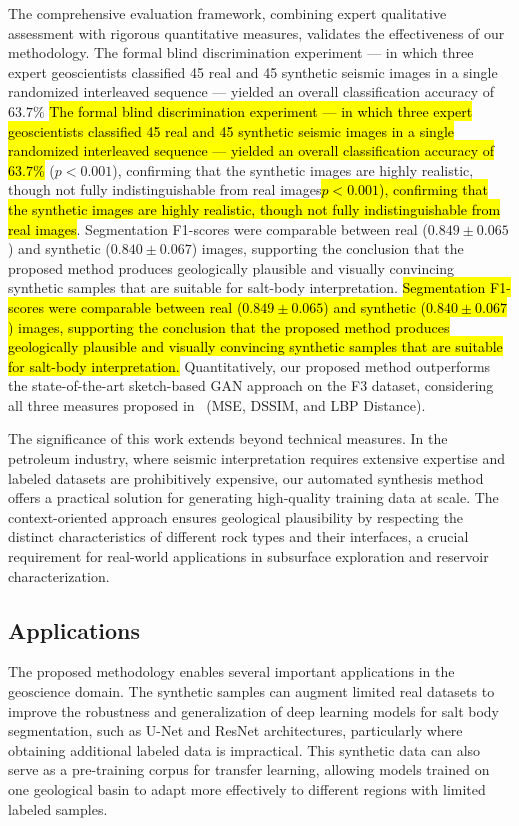 \documentclass{ieeeaccess}
\makeatletter
\DeclareRobustCommand{\DIFaddbegin}{\DIFOaddbegin \let\includegraphics\DIFaddincludegraphics} %
\DeclareRobustCommand{\DIFaddend}{\DIFOaddend \let\includegraphics\DIFOincludegraphics} %
\DeclareRobustCommand{\DIFdelbegin}{\DIFOdelbegin \let\includegraphics\DIFdelincludegraphics} %
\DeclareRobustCommand{\DIFdelend}{\DIFOaddend \let\includegraphics\DIFOincludegraphics} %
\let\sout@orig\sout %
\renewcommand{\sout}[1]{\ifmmode\text{\sout@orig{\ensuremath{#1}}}\else\sout@orig{#1}\fi} %
\providecommand{\DIFadd}[1]{{\protect\color{blue}#1}}
\providecommand{\DIFdel}[1]{{\protect\color{red}\sout{#1}}}
\renewcommand{\DIFadd}[1]{\ifmmode#1\else\begingroup\let\protect\relax\hl{#1}\endgroup\fi}
\renewcommand{\DIFdel}[1]{}
\providecommand{\DIFaddbegin}{}
\providecommand{\DIFaddend}{}
\providecommand{\DIFdelbegin}{}
\providecommand{\DIFdelend}{}
\renewcommand{\DIFaddbegin}{}
\renewcommand{\DIFaddend}{}
\renewcommand{\DIFdelbegin}{}
\renewcommand{\DIFdelend}{}
\makeatother
\begin{document}
The comprehensive evaluation framework, combining expert qualitative assessment with rigorous quantitative measures, validates the effectiveness of our methodology. \DIFdelbegin \DIFdel{Three geoscience experts evaluated the synthetic samples, achieving F1-scores that differed by less than 2\% from their evaluations of real images}\DIFdelend \DIFaddbegin \DIFadd{The formal blind discrimination experiment — in which three expert geoscientists classified 45 real and 45 synthetic seismic images in a single randomized interleaved sequence — yielded an overall classification accuracy of $63.7\%$ }\DIFaddend (\DIFdelbegin \DIFdel{0.86901 vs. 0.88159) , demonstrating that the synthetic images are virtually indistinguishable from authentic seismic data}\DIFdelend \DIFaddbegin \DIFadd{$p < 0.001$), confirming that the synthetic images are highly realistic, though not fully indistinguishable from real images}\DIFaddend . \DIFaddbegin \DIFadd{Segmentation F1-scores were comparable between real ($0.849 \pm 0.065$) and synthetic ($0.840 \pm 0.067$) images, supporting the conclusion that the proposed method produces geologically plausible and visually convincing synthetic samples that are suitable for salt-body interpretation. }\DIFaddend Quantitatively, our proposed method \DIFdelbegin \DIFdel{tends to   }\DIFdelend outperforms the state-of-the-art sketch-based GAN approach on the F3 dataset, considering all three measures proposed in~\cite{Ferreira2020} (MSE, DSSIM, and LBP Distance).

The significance of this work extends beyond technical measures. In the petroleum industry, where seismic interpretation requires extensive expertise and labeled datasets are prohibitively expensive, our automated synthesis method offers a practical solution for generating high-quality training data at scale. The context-oriented approach ensures geological plausibility by respecting the distinct characteristics of different rock types and their interfaces, a crucial requirement for real-world applications in subsurface exploration and reservoir characterization.

\subsection{Applications}

The proposed methodology enables several important applications in the geoscience domain. The synthetic samples can augment limited real datasets to improve the robustness and generalization of deep learning models for salt body segmentation, such as U-Net and ResNet architectures, particularly where obtaining additional labeled data is impractical. This synthetic data can also serve as a pre-training corpus for transfer learning, allowing models trained on one geological basin to adapt more effectively to different regions with limited labeled samples.
\end{document}
